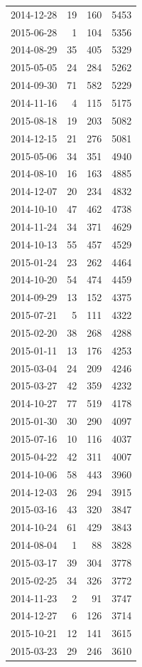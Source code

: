 \begin{tabular}{lrrr}
2014-12-28 & 19 & 160 & 5453 \\
2015-06-28 & 1 & 104 & 5356 \\
2014-08-29 & 35 & 405 & 5329 \\
2015-05-05 & 24 & 284 & 5262 \\
2014-09-30 & 71 & 582 & 5229 \\
2014-11-16 & 4 & 115 & 5175 \\
2015-08-18 & 19 & 203 & 5082 \\
2014-12-15 & 21 & 276 & 5081 \\
2015-05-06 & 34 & 351 & 4940 \\
2014-08-10 & 16 & 163 & 4885 \\
2014-12-07 & 20 & 234 & 4832 \\
2014-10-10 & 47 & 462 & 4738 \\
2014-11-24 & 34 & 371 & 4629 \\
2014-10-13 & 55 & 457 & 4529 \\
2015-01-24 & 23 & 262 & 4464 \\
2014-10-20 & 54 & 474 & 4459 \\
2014-09-29 & 13 & 152 & 4375 \\
2015-07-21 & 5 & 111 & 4322 \\
2015-02-20 & 38 & 268 & 4288 \\
2015-01-11 & 13 & 176 & 4253 \\
2015-03-04 & 24 & 209 & 4246 \\
2015-03-27 & 42 & 359 & 4232 \\
2014-10-27 & 77 & 519 & 4178 \\
2015-01-30 & 30 & 290 & 4097 \\
2015-07-16 & 10 & 116 & 4037 \\
2015-04-22 & 42 & 311 & 4007 \\
2014-10-06 & 58 & 443 & 3960 \\
2014-12-03 & 26 & 294 & 3915 \\
2015-03-16 & 43 & 320 & 3847 \\
2014-10-24 & 61 & 429 & 3843 \\
2014-08-04 & 1 & 88 & 3828 \\
2015-03-17 & 39 & 304 & 3778 \\
2015-02-25 & 34 & 326 & 3772 \\
2014-11-23 & 2 & 91 & 3747 \\
2014-12-27 & 6 & 126 & 3714 \\
2015-10-21 & 12 & 141 & 3615 \\
2015-03-23 & 29 & 246 & 3610 \\

\end{tabular}
